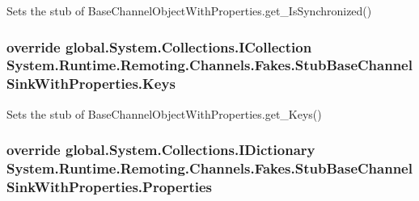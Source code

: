 Sets the stub of Base\-Channel\-Object\-With\-Properties.\-get\-\_\-\-Is\-Synchronized()

\hypertarget{class_system_1_1_runtime_1_1_remoting_1_1_channels_1_1_fakes_1_1_stub_base_channel_sink_with_properties_a6ce9635b728ecf4eb97fe57451f283cd}{
\subsubsection[{Keys}]{\setlength{\rightskip}{0pt plus 5cm}override global.\-System.\-Collections.\-I\-Collection System.\-Runtime.\-Remoting.\-Channels.\-Fakes.\-Stub\-Base\-Channel\-Sink\-With\-Properties.\-Keys\hspace{0.3cm}{\ttfamily [get]}}}\label{class_system_1_1_runtime_1_1_remoting_1_1_channels_1_1_fakes_1_1_stub_base_channel_sink_with_properties_a6ce9635b728ecf4eb97fe57451f283cd}


Sets the stub of Base\-Channel\-Object\-With\-Properties.\-get\-\_\-\-Keys()

\hypertarget{class_system_1_1_runtime_1_1_remoting_1_1_channels_1_1_fakes_1_1_stub_base_channel_sink_with_properties_a818a47b4fb95c6fbb530e0edcaeff41e}{
\subsubsection[{Properties}]{\setlength{\rightskip}{0pt plus 5cm}override global.\-System.\-Collections.\-I\-Dictionary System.\-Runtime.\-Remoting.\-Channels.\-Fakes.\-Stub\-Base\-Channel\-Sink\-With\-Properties.\-Properties\hspace{0.3cm}{\ttfamily [get]}}}\label{class_system_1_1_runtime_1_1_remoting_1_1_channels_1_1_fakes_1_1_stub_base_channel_sink_with_properties_a818a47b4fb95c6fbb530e0edcaeff41e}


